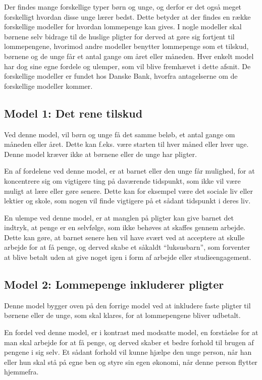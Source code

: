 Der findes mange forskellige typer børn og unge, 
og derfor er det også meget forskelligt hvordan 
disse unge lærer bedst. Dette betyder at 
der findes en række forskellige modeller for 
hvordan lommepenge kan gives. I nogle modeller 
skal børnene selv bidrage til de huslige pligter 
for derved at gøre sig fortjent til 
lommepengene, hvorimod andre modeller benytter 
lommepenge som et tilskud, børnene og de unge 
får et antal gange om året eller måneden. Hver 
enkelt model har dog sine egne fordele og 
ulemper, som vil blive fremhævet i dette afsnit. 
De forskellige modeller er fundet hos Danske 
Bank, hvorfra antagelserne om de forskellige 
modeller kommer\cite{DanskeB2}\cite{DanskeB3}.

\subsection{Model 1: Det rene tilskud}
Ved denne model, vil børn og unge få det samme 
beløb, et antal gange om måneden eller året. 
Dette kan f.eks. være starten til hver måned 
eller hver uge. Denne model kræver ikke 
at børnene eller de unge har pligter.

En af fordelene ved denne model, er at barnet 
eller den unge får mulighed, for at koncentrere 
sig om vigtigere ting på daværende tidspunkt, 
som ikke vil være muligt at lære eller gøre 
senere. Dette kan for eksempel være det sociale 
liv eller lektier og skole, som nogen vil finde 
vigtigere på et sådant tidspunkt i deres liv.

En ulempe ved denne model, er at manglen på 
pligter kan give barnet det indtryk, at penge er 
en selvfølge, som ikke behøves at skaffes gennem 
arbejde. Dette kan gøre, at barnet senere hen 
vil have svært ved at acceptere at skulle 
arbejde for at få penge, og derved skabe et 
såkaldt “luksusbarn”, som forventer at blive 
betalt uden at give noget igen i form af 
arbejde eller studieengagement.

\subsection{Model 2: Lommepenge inkluderer 
pligter}
Denne model bygger oven på den forrige model ved 
at inkludere faste pligter til børnene eller de 
unge, som skal klares, for at lommepengene 
bliver udbetalt.

En fordel ved denne model, er i kontrast med 
modsatte model, en forståelse for at man skal 
arbejde for at få penge, og derved skaber et 
bedre forhold til brugen af pengene i sig selv. 
Et sådant forhold vil kunne hjælpe den unge 
person, når han eller hun skal stå på egne ben 
og styre sin egen økonomi, når denne person 
flytter hjemmefra.


